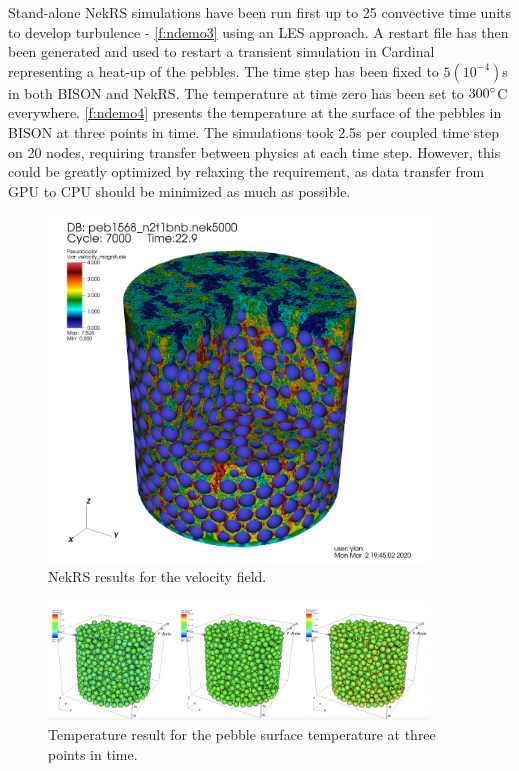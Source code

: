 Stand-alone NekRS simulations have been run first up to 25 convective time units to develop turbulence - \autoref{f:ndemo3} using an LES approach.
A restart file has then been generated and used to restart a transient simulation in Cardinal representing a heat-up of the pebbles.
The time step has been fixed to $5(10^{-4})$s in both BISON and NekRS.
The temperature at time zero has been set to $300\degree$C everywhere.
\autoref{f:ndemo4} presents the temperature at the surface of the pebbles in BISON at three points in time.
The simulations took 2.5s per coupled time step on 20 nodes, requiring transfer between physics at each time step.
However, this could be greatly optimized by relaxing the requirement, as data transfer from GPU to CPU should be minimized as much as possible.

\begin{figure}[t!]
\centering
\includegraphics[clip=true,width=0.9\textwidth]{Figures/ndemo_r3}
\caption{NekRS results for the velocity field.}
\label{f:ndemo3}
\end{figure}


\begin{figure}[htb!]
\centering
\includegraphics[clip=true,width=0.9\textwidth]{Figures/ndemo_r4}
\caption{Temperature result for the pebble surface temperature at three points in time.}
\label{f:ndemo4}
\end{figure}

